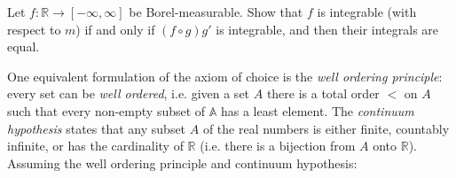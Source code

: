 \documentclass[answers]{exam}
\begin{document}
\begin{questions}
\begin{parts}
\begin{subparts}
\subpart%
Let $f: \mathbb{R} \to[-\infty, \infty]$ be Borel-measurable. Show that $f$ is integrable (with respect to $m$) if and only if $(f \circ g) g'$ is integrable, and then their integrals are equal.
\end{subparts}
\end{parts}


\question%
One equivalent formulation of the axiom of choice is the \emph{well ordering principle}: every set can be \emph{well ordered}, i.e. given a set $A$ there is a total order $<$ on $A$ such that every non-empty subset of $\mathbb{A}$ has a least element. The \emph{continuum hypothesis} states that any subset $A$ of the real numbers is either finite, countably infinite, or has the cardinality of $\mathbb{R}$ (i.e. there is a bijection from $A$ onto $\mathbb{R}$). Assuming the well ordering principle and continuum hypothesis:

\end{questions}
\end{document}
